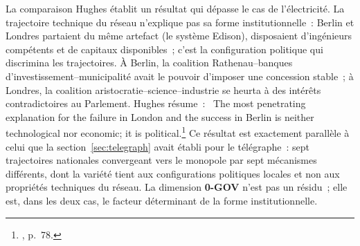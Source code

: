 %
La comparaison Hughes établit un résultat qui dépasse le cas de l'électricité. La trajectoire technique du réseau n'explique pas sa forme institutionnelle~: Berlin et Londres partaient du même artefact (le système Edison), disposaient d'ingénieurs compétents et de capitaux disponibles~; c'est la configuration politique qui discrimina les trajectoires. À Berlin, la coalition Rathenau--banques d'investissement--municipalité avait le pouvoir d'imposer une concession stable~; à Londres, la coalition aristocratie--science--industrie se heurta à des intérêts contradictoires au Parlement. Hughes résume~: \og~The most penetrating explanation for the failure in London and the success in Berlin is neither technological nor economic; it is political.\fg{}\footnote{\textcite{hughes_networks_1983}, p.~78.} Ce résultat est exactement parallèle à celui que la section~\ref{sec:telegraph} avait établi pour le télégraphe~: sept trajectoires nationales convergeant vers le monopole par sept mécanismes différents, dont la variété tient aux configurations politiques locales et non aux propriétés techniques du réseau. La dimension \textbf{0-GOV} n'est pas un résidu~; elle est, dans les deux cas, le facteur déterminant de la forme institutionnelle.





